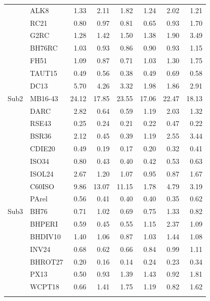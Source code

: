 \begin{ThreePartTable}
\begin{longtable}{lld{2.2}d{2.2}d{2.2}d{2.2}d{2.2}d{2.2}}
          & ALK8      & 1.33  & 2.11  & 1.82  & 1.24   & 2.02  & 1.21  \\
          & RC21      & 0.80  & 0.97  & 0.81  & 0.65   & 0.93  & 1.70  \\
          & G2RC      & 1.28  & 1.42  & 1.50  & 1.38   & 1.90  & 3.49  \\
          & BH76RC    & 1.03  & 0.93  & 0.86  & 0.90   & 0.93  & 1.15  \\
          & FH51      & 1.09  & 0.87  & 0.71  & 1.03   & 1.30  & 1.75  \\
          & TAUT15    & 0.49  & 0.56  & 0.38  & 0.49   & 0.69  & 0.58  \\
          & DC13      & 5.70  & 4.26  & 3.32  & 1.98   & 1.86  & 2.91  \\ \hdashline
  Sub2    & MB16-43   & 24.12 & 17.85 & 23.55 & 17.06  & 22.47 & 18.13 \\
          & DARC      & 2.82  & 0.64  & 0.59  & 1.19   & 2.03  & 1.32  \\
          & RSE43     & 0.25  & 0.24  & 0.21  & 0.22   & 0.47  & 0.22  \\
          & BSR36     & 2.12  & 0.45  & 0.39  & 1.19   & 2.55  & 3.44  \\
          & CDIE20    & 0.49  & 0.19  & 0.17  & 0.20   & 0.32  & 0.41  \\
          & ISO34     & 0.80  & 0.43  & 0.40  & 0.42   & 0.53  & 0.63  \\
          & ISOL24    & 2.67  & 1.20  & 1.07  & 0.95   & 0.87  & 1.67  \\
          & C60ISO    & 9.86  & 13.07 & 11.15 & 1.78   & 4.79  & 3.19  \\
          & PArel     & 0.56  & 0.41  & 0.40  & 0.40   & 0.35  & 0.62  \\ \hdashline
  Sub3    & BH76      & 0.71  & 1.02  & 0.69  & 0.75   & 1.33  & 0.82  \\
          & BHPERI    & 0.59  & 0.45  & 0.55  & 1.15   & 2.37  & 1.09  \\
          & BHDIV10   & 1.40  & 1.06  & 0.87  & 1.03   & 1.44  & 1.08  \\
          & INV24     & 0.68  & 0.62  & 0.66  & 0.84   & 0.99  & 1.11  \\
          & BHROT27   & 0.20  & 0.16  & 0.14  & 0.24   & 0.23  & 0.34  \\
          & PX13      & 0.50  & 0.93  & 1.39  & 1.43   & 0.92  & 1.81  \\
          & WCPT18    & 0.66  & 1.41  & 1.75  & 1.19   & 0.82  & 1.62  \\ \hdashline

\end{longtable}
\end{ThreePartTable}
